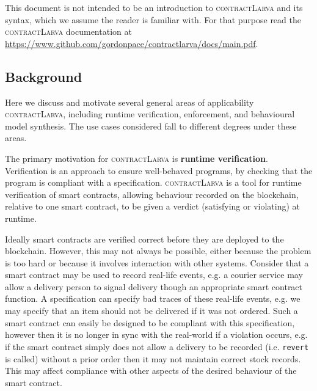 \documentclass{article}
\newcommand{\contractlarva}{\textsc{contractLarva}\xspace}
\begin{document}
 This document is not intended to be an introduction to \contractlarva and its syntax, which we assume the reader is familiar with. For that purpose read the \contractlarva documentation at \url{https://www.github.com/gordonpace/contractlarva/docs/main.pdf}. 


  \subsection{Background}
  
  Here we discuss and motivate several general areas of applicability \contractlarva, including runtime verification, enforcement, and behavioural model synthesis. The use cases considered fall to different degrees under these areas.


  The primary motivation for \contractlarva is \textbf{runtime verification}. Verification is an approach to ensure well-behaved programs, by checking that the program is compliant with a specification. \contractlarva is a tool for runtime verification of smart contracts, allowing behaviour recorded on the blockchain, relative to one smart contract, to be given a verdict (satisfying or violating) at runtime. 
  
  Ideally smart contracts are verified correct before they are deployed to the blockchain. However, this may not always be possible, either because the problem is too hard or because it involves interaction with other systems. Consider that a smart contract may be used to record real-life events, e.g. a courier service may allow a delivery person to signal delivery though an appropriate smart contract function. A specification can specify bad traces of these real-life events, e.g. we may specify that an item should not be delivered if it was not ordered. Such a smart contract can easily be designed to be compliant with this specification, however then it is no longer in sync with the real-world if a violation occurs, e.g. if the smart contract simply does not allow a delivery to be recorded (i.e. \texttt{revert} is called) without a prior order then it may not maintain correct stock records. This may affect compliance with other aspects of the desired behaviour of the smart contract. 
  
\end{document}
